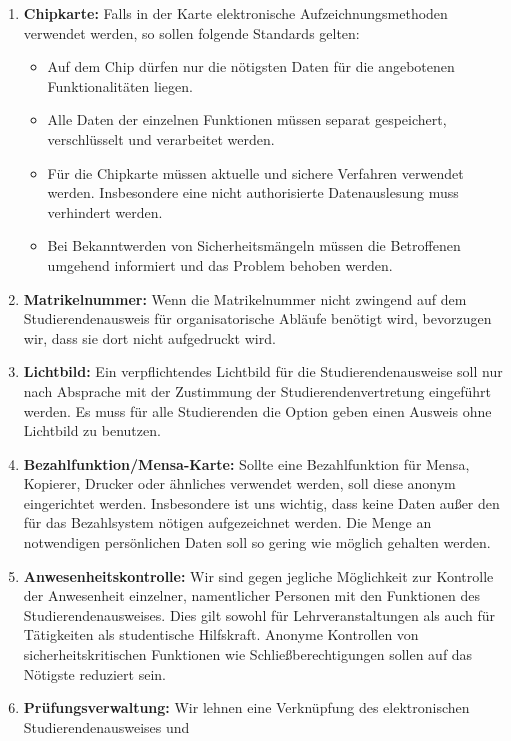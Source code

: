 \documentclass[DIV=calc]{scrartcl}
\begin{document}
\begin{enumerate}
\itemsep1pt\parskip0pt
    \item{\textbf{Chipkarte:} Falls in der Karte elektronische Aufzeichnungsmethoden verwendet werden, so sollen folgende Standards gelten:
	\begin{itemize}
	\itemsep1pt\parskip0pt

	    \item{Auf dem Chip dürfen nur die nötigsten Daten für die angebotenen Funktionalitäten liegen.}
	    \item{Alle Daten der einzelnen Funktionen müssen separat gespeichert, verschlüsselt und verarbeitet werden.}
	    \item{Für die Chipkarte müssen aktuelle und sichere Verfahren verwendet werden. Insbesondere eine nicht authorisierte Datenauslesung muss verhindert werden.}
	    \item{Bei Bekanntwerden von Sicherheitsmängeln müssen die Betroffenen umgehend informiert und das Problem behoben werden.}
	\end{itemize}
    }
    \item{\textbf{Matrikelnummer:} Wenn die Matrikelnummer nicht zwingend auf dem Studierendenausweis für
    organisatorische Abläufe benötigt wird, bevorzugen wir, dass sie dort nicht aufgedruckt wird.}
    \item{\textbf{Lichtbild:} Ein verpflichtendes Lichtbild für die Studierendenausweise soll nur nach Absprache
    mit der Zustimmung der Studierendenvertretung eingeführt werden. Es muss für alle Studierenden
    die Option geben einen Ausweis ohne Lichtbild zu benutzen.}
    \item{\textbf{Bezahlfunktion/Mensa-Karte:} Sollte eine Bezahlfunktion für Mensa, Kopierer, Drucker oder
    ähnliches verwendet werden, soll diese anonym eingerichtet werden. Insbesondere ist uns wichtig,
    dass keine Daten außer den für das Bezahlsystem nötigen aufgezeichnet werden. Die Menge an
    notwendigen persönlichen Daten soll so gering wie möglich gehalten werden.}
    \item{\textbf{Anwesenheitskontrolle:} Wir sind gegen jegliche Möglichkeit zur Kontrolle der Anwesenheit
    einzelner, namentlicher Personen mit den Funktionen des Studierendenausweises. Dies gilt
    sowohl für Lehrveranstaltungen als auch für Tätigkeiten als studentische Hilfskraft. Anonyme
    Kontrollen von sicherheitskritischen Funktionen wie Schließberechtigungen sollen auf das Nötigste
    reduziert sein.}
    \item{\textbf{Prüfungsverwaltung:} Wir lehnen eine Verknüpfung des elektronischen Studierendenausweises und
}
\end{enumerate}
\end{document}
